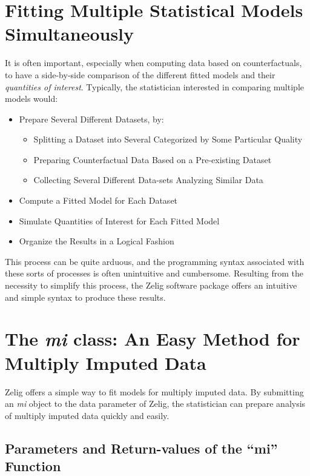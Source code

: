 \documentclass[a4paper,11pt]{article}
\begin{document}
\section*{Fitting Multiple Statistical Models Simultaneously}

It is often important, especially when computing data based on counterfactuals, to have a side-by-side comparison of the different fitted models and their \emph{quantities of interest}.  Typically, the statistician interested in comparing multiple models would:
\begin{itemize}
	\item{Prepare Several Different Datasets, by:}
	\begin{itemize}
		\item{Splitting a Dataset into Several Categorized by Some Particular Quality}
		\item{Preparing Counterfactual Data Based on a Pre-existing Dataset}
		\item{Collecting Several Different Data-sets Analyzing Similar Data}
	\end{itemize}
	\item{Compute a Fitted Model for Each Dataset}
	\item{Simulate Quantities of Interest for Each Fitted Model}
	\item{Organize the Results in a Logical Fashion}
\end{itemize}

This process can be quite arduous, and the programming syntax associated with these sorts of processes is often unintuitive and cumbersome.  Resulting from the necessity to simplify this process, the Zelig software package offers an intuitive and simple syntax to produce these results.

\section{The \emph{mi} class: An Easy Method for Multiply Imputed Data}

Zelig offers a simple way to fit models for multiply imputed data.  By submitting an \emph{mi} object to the data parameter of Zelig, the statistician can prepare analysis of multiply imputed data quickly and easily.

\subsection{Parameters and Return-values of the ``mi'' Function}
\end{document}
